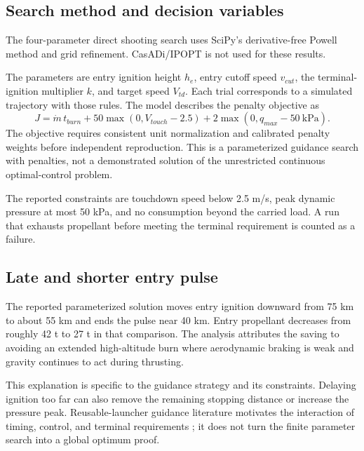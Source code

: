 \documentclass[11pt,a4paper]{article}
\begin{document}
\subsection{Search method and decision variables}
The four-parameter direct shooting search uses SciPy's derivative-free Powell method and grid refinement. CasADi/IPOPT is not used for these results.



The parameters are entry ignition height $h_e$, entry cutoff speed $v_{cut}$, the terminal-ignition multiplier $k$, and target speed $V_{td}$. Each trial corresponds to a simulated trajectory with those rules. The model describes the penalty objective as
\begin{equation}
 J=\dot m\,t_{burn}
 +50\max(0,V_{touch}-2.5)
 +2\max(0,q_{max}-50\ \mathrm{kPa}).
\label{eq:objective}
\end{equation}
The objective requires consistent unit normalization and calibrated penalty weights before independent reproduction. This is a parameterized guidance search with penalties, not a demonstrated solution of the unrestricted continuous optimal-control problem.

The reported constraints are touchdown speed below 2.5 m/s, peak dynamic pressure at most 50 kPa, and no consumption beyond the carried load. A run that exhausts propellant before meeting the terminal requirement is counted as a failure.

\subsection{Late and shorter entry pulse}


The reported parameterized solution moves entry ignition downward from 75 km to about 55 km and ends the pulse near 40 km. Entry propellant decreases from roughly 42 t to 27 t in that comparison. The analysis attributes the saving to avoiding an extended high-altitude burn where aerodynamic braking is weak and gravity continues to act during thrusting.

This explanation is specific to the guidance strategy and its constraints. Delaying ignition too far can also remove the remaining stopping distance or increase the pressure peak. Reusable-launcher guidance literature motivates the interaction of timing, control, and terminal requirements \cite{wilken,simplicio,botelho}; it does not turn the finite parameter search into a global optimum proof.
\end{document}
